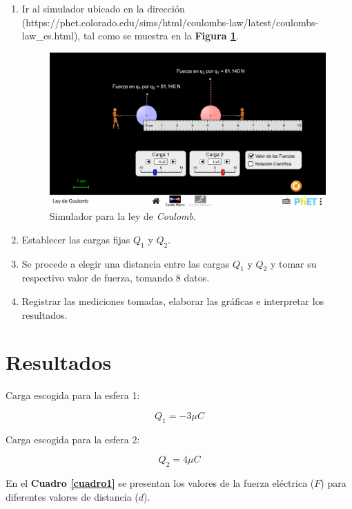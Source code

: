 \documentclass[letter,11pt]{article}
\begin{document}
\begin{enumerate}
\item Ir al simulador ubicado en la dirección
(https://phet.colorado.edu/sims/html/coulombs-law/latest/coulombs-law\_es.html),
tal como se muestra en la \textbf{Figura \ref{figura2}}.
\begin{figure}[!h]
\centering
\includegraphics[scale=0.30]{resources/figura2.eps}
\caption{Simulador para la ley de \emph{Coulomb}.}
\label{figura2}
\end{figure}
\item Establecer las cargas fijas $Q_1$ y $Q_2$.
\item Se procede a elegir una distancia entre las cargas $Q_1$ y $Q_2$ y tomar
su respectivo valor de fuerza, tomando 8 datos.
\item Registrar las mediciones tomadas, elaborar las gráficas e interpretar los
resultados.
\end{enumerate}

\section{Resultados}

Carga escogida para la esfera 1:

\begin{equation*}
    Q_1 = -3 \mu C
\end{equation*}

Carga escogida para la esfera 2:

\begin{equation*}
    Q_2 = 4 \mu C
\end{equation*}

En el \textbf{Cuadro \ref{cuadro1}} se presentan los valores de la fuerza
eléctrica ($F$) para diferentes valores de distancia ($d$).
\end{document}
